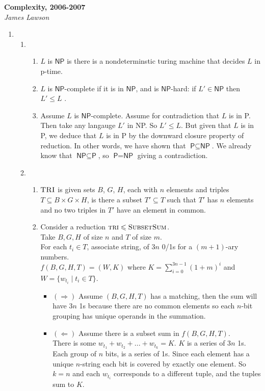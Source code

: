 \documentclass[a4paper, draft, 12pt]{article}
\begin{document}
\textbf{Complexity, 2006-2007}\\
\textit{James Lawson}

\begin{enumerate} 
\item %
\begin{enumerate}
\item %
  \begin{enumerate}
  \item %
  $L$ is $\textsf{NP}$ is there is a nondeterminstic turing machine that decides $L$ in p-time.
  \item %
   $L$ is $\textsf{NP}$-complete if it is in $\textsf{NP}$, and is $\textsf{NP}$-hard: if $L' \in \textsf{NP}$ then $L' \leqslant L$ .
  \item %
  Assume $L$ is $\textsf{NP}$-complete. 
  Assume for contradiction that $L$ is in \textsf{P}.
  Then take any langauge $L'$ in \textsf{NP}.
  So $L' \leqslant L$. 
  But given that $L$ is in \textsf{P}, we deduce that $L$ is in \textsf{P} by the downward closure property of reduction. 
  In other words, we have shown that $\textsf{P} \subseteq \textsf{NP}$. We already know that $\textsf{NP} \subseteq \textsf{P}$, 
  so $\textsf{P} = \textsf{NP}$ giving a contradiction. 
  \end{enumerate}
\item %
  \begin{enumerate}
  \item %
  $\textsc{TRI}$ is given sets $B$, $G$, $H$, each with $n$ elements
  and triples $T \subseteq B \times G \times H$, is there a subset $T' \subseteq T$ 
  such that $T'$ has $n$ elements and no two triples in $T'$ have an element in common.  

  \item %
  Consider a reduction $\textsc{tri} \leqslant \textsc{SubsetSum}$. \\
  Take $B, G, H $ of size $n$ and $T$ of size $m$.\\
  For each $t_i \in T$, associate string, of $3n$ 0/1s for a $(m+1)$-ary numbers. \\
  $f(B,G,H,T) = (W,K)$ where $K = \sum^{3n-1}_{i=0}(1+m)^{i}$ and $W = \{w_{t_i} \;|\; t_i \in T\}$. 
  \begin{itemize}
  \item $(\Rightarrow)$ Assume $(B,G, H, T)$ has a matching, then the sum will have $3n$ 1s because 
  there are no common elements so each $n$-bit grouping has unique operands in the summation. 
  \item $(\Leftarrow)$ Assume there is a subset sum in $f(B,G,H,T)$. \\
  There is some $w_{t_1} + w_{t_2} + ... + w_{t_k} = K$. $K$ is a series of 3$n$ 1s. 
  Each group of $n$ bits, is a series of 1s. Since each element has a unique $n$-string
  each bit is covered by exactly one element. So $k = n$ and each $w_{t_i}$ corresponds 
  to a different tuple, and the tuples sum to $K$.  
  \end{itemize}


\end{enumerate}
\end{enumerate}
\end{enumerate}
\end{document}
